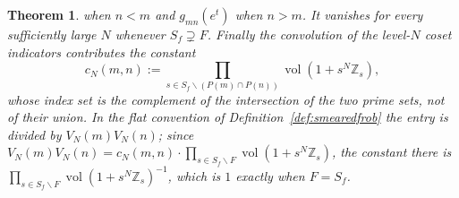 \documentclass[11pt]{amsart}
\newtheorem{theorem}{Theorem}[section]
\theoremstyle{definition}
\theoremstyle{remark}
\newcommand{\Z}{\mathbb Z}
\newcommand{\vol}{\operatorname{vol}}
\begin{document}
\begin{theorem}
when $n<m$ and $g_{mn}(e^{t})$ when $n>m$. It
vanishes for every sufficiently large $N$ whenever $S_f\supsetneq F$.
Finally the convolution of the level-$N$ coset indicators contributes the
constant
\begin{equation}\label{eq:gramconst}
  c_N(m,n):=\prod_{s\in S_f\smallsetminus(P(m)\cap P(n))}\vol(1+s^N\Z_s),
\end{equation}
whose index set is the complement of the \emph{intersection} of the two prime
sets, not of their union. In the flat convention of
Definition~\ref{def:smearedfrob} the entry is divided by $V_N(m)V_N(n)$; since
$V_N(m)V_N(n)=c_N(m,n)\cdot\prod_{s\in S_f\smallsetminus F}\vol(1+s^N\Z_s)$,
the constant there is $\prod_{s\in S_f\smallsetminus F}\vol(1+s^N\Z_s)^{-1}$,
which is $1$ exactly when $F=S_f$.
\end{theorem}
\end{document}
